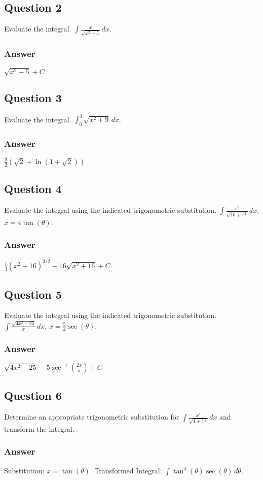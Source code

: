 \documentclass{article}
\begin{document}
\subsection*{Question 2}
Evaluate the integral. $\int \frac{x}{\sqrt{x^2-5}} \,dx$.
\subsubsection*{Answer}
$ \sqrt{x^2-5} + C $

\subsection*{Question 3}
Evaluate the integral. $\int_0^3 \sqrt{x^2+9} \,dx$.
\subsubsection*{Answer}
$ \frac{9}{2}(\sqrt{2} + \ln(1+\sqrt{2})) $

\subsection*{Question 4}
Evaluate the integral using the indicated trigonometric substitution. $\int \frac{x^3}{\sqrt{16+x^2}} \,dx$, $x=4\tan(\theta)$.
\subsubsection*{Answer}
$ \frac{1}{3}(x^2+16)^{3/2} - 16\sqrt{x^2+16} + C $

\subsection*{Question 5}
Evaluate the integral using the indicated trigonometric substitution. $\int \frac{\sqrt{4x^2-25}}{x} \,dx$, $x=\frac{5}{2}\sec(\theta)$.
\subsubsection*{Answer}
$ \sqrt{4x^2-25} - 5\sec^{-1}(\frac{2x}{5}) + C $

\subsection*{Question 6}
Determine an appropriate trigonometric substitution for $\int \frac{x^4}{\sqrt{1+x^2}} \,dx$ and transform the integral.
\subsubsection*{Answer}
Substitution: $x=\tan(\theta)$. Transformed Integral: $\int \tan^4(\theta)\sec(\theta) \,d\theta$.
\end{document}
